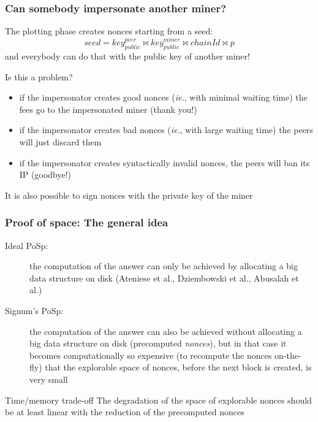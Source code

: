 \documentclass[11pt]{beamer}  %
\newcommand{\iestart}{\textit{ie.}, }
\newcommand{\seed}{{\mathit{seed}}}
\newcommand{\public}{{\mathit{public}}}
\newcommand{\chainid}{{\mathit{chainId}}}
\DeclareMathOperator*{\append}{\bowtie}
\begin{document}
\begin{frame}\frametitle{Can somebody impersonate another miner?}

  The plotting phase creates nonces starting from a seed:
  \[
  \seed=\mathit{key}^{\mathit{peer}}_\public\append\mathit{key}^{\mathit{miner}}_\public\append\chainid\bowtie p  
  \]
  and everybody can do that with the public key of another miner!

  \medskip
  \begin{center}
    \alert{Is this a problem?}
  \end{center}
  \medskip
  \pause
  \begin{itemize}[<+->]
  \item if the impersonator creates good nonces (\iestart{}with minimal waiting time)
    the fees go to the impersonated miner (thank you!)
  \item if the impersonator creates bad nonces (\iestart{}with large waiting time)
    the peers will just discard them
  \item if the impersonator creates syntactically invalid nonces,
    the peers will ban its IP (goodbye!)
  \end{itemize}
  \pause
  It is also possible to sign nonces with the private key of the miner
\end{frame}

\addtocounter{framenumber}{-1}

\begin{frame}\frametitle{Proof of space: The general idea}

  \begin{description}
  \item[Ideal PoSp:] the computation of the answer can only be achieved by allocating
    a big data structure on disk (Ateniese et al., Dziembowski et al., Abusalah et al.)
    \medskip
  \item[Signum's PoSp:] the computation of the answer can also be achieved without
    allocating a big data structure on disk (precomputed \emph{nonces}),
    but in that case it becomes
    computationally so expensive (to recompute the nonces on-the-fly)
    that the explorable space of nonces, before the next block is created, is very small
  \end{description}

  \bigskip
  
  \begin{redbox}{Time/memory trade-off}
    The degradation of the space of explorable nonces should be at least linear with
    the reduction of the precomputed nonces
  \end{redbox}

\end{frame}
\end{document}
